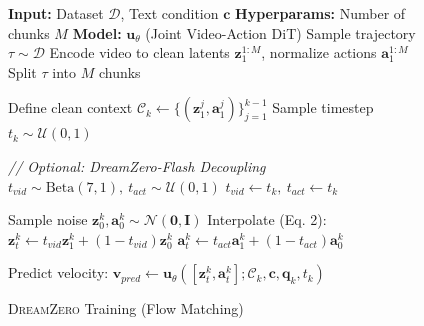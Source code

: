\documentclass[10pt,logo,copyright]{nvidiatechreport}
\newcommand{\ourmethod}{\mbox{\textsc{DreamZero}}\xspace}
\begin{document}
\begin{figure}[t!]
    \centering
    \begin{minipage}[t]{0.48\textwidth}
        \begin{algorithm}[H] %
            \caption{\ourmethod Training (Flow Matching)}
            \label{alg:dreamzero_train}
            \begin{algorithmic}[1]
                \State \textbf{Input:} Dataset $\mathcal{D}$, Text condition $\mathbf{c}$
                \State \textbf{Hyperparams:} Number of chunks $M$
                \State \textbf{Model:} $\mathbf{u}_{\theta}$ (Joint Video-Action DiT)
                    \State Sample trajectory $\tau \sim \mathcal{D}$
                    \State Encode video to clean latents $\mathbf{z}_{1}^{1:M}$, normalize actions $\mathbf{a}_{1}^{1:M}$
                    \State Split $\tau$ into $M$ chunks
                    
                     
                        \State Define clean context $\mathcal{C}_{k} \leftarrow \{(\mathbf{z}_1^j, \mathbf{a}_1^j)\}_{j=1}^{k-1}$ 
                        \State Sample timestep $t_k \sim \mathcal{U}(0,1)$
                        
                        \State \textit{// Optional: DreamZero-Flash Decoupling}
                            \State $t_{vid} \sim \text{Beta}(7, 1), \ t_{act} \sim \mathcal{U}(0,1)$
                        \Else
                            \State $t_{vid} \leftarrow t_k, \ t_{act} \leftarrow t_k$
                        \EndIf
                        
                        \State Sample noise $\mathbf{z}_{0}^{k}, \mathbf{a}_{0}^{k} \sim \mathcal{N}(\mathbf{0}, \mathbf{I})$
                        \State Interpolate (Eq. 2):
                        \State \quad $\mathbf{z}_{t}^{k} \leftarrow t_{vid} \mathbf{z}_{1}^{k} + (1-t_{vid}) \mathbf{z}_{0}^{k}$
                        \State \quad $\mathbf{a}_{t}^{k} \leftarrow t_{act} \mathbf{a}_{1}^{k} + (1-t_{act}) \mathbf{a}_{0}^{k}$
                        
                        \State Predict velocity:
                        \State \quad $\mathbf{v}_{pred} \leftarrow \mathbf{u}_{\theta}([\mathbf{z}_{t}^{k}, \mathbf{a}_{t}^{k}]; \mathcal{C}_{k}, \mathbf{c}, \mathbf{q}_{k}, t_k)$
                        

\end{algorithmic}
\end{algorithm}
\end{minipage}
\end{figure}
\end{document}
